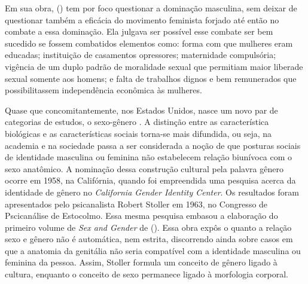 Em sua obra,  (\citeyear{BEAUVOIR1967}) tem por foco questionar a dominação masculina, sem deixar de questionar também a eficácia do movimento feminista forjado até então no combate a essa dominação. Ela julgava ser possível esse combate ser bem sucedido se fossem combatidos elementos como: forma com que mulheres eram educadas; instituição de casamentos opressores; maternidade compulsória; vigência de um duplo padrão de moralidade sexual que permitiam maior liberade sexual somente aos homens; e falta de trabalhos dignos e bem remunerados que possibilitassem independência econômica às mulheres. 

Quase que concomitantemente, nos Estados Unidos, nasce um novo par de categorias de estudos, o sexo-gênero \cite{FRAISSE2001,STOLKE2004,HARAWAY2004}. A distinção entre as característica biológicas e as características sociais torna-se mais difundida, ou seja, na academia e na sociedade passa a ser considerada a noção de que posturas sociais de identidade masculina ou feminina não estabelecem relação biunívoca com o sexo anatômico.
A nominação dessa construção cultural pela palavra gênero ocorre em 1958, na Califórnia, quando foi empreendida uma pesquisa acerca da identidade de gênero no \emph{California Gender Identity Center}. Os resultados foram apresentados pelo psicanalista Robert Stoller em 1963, no Congresso de Pscicanálise de Estocolmo. Essa mesma pesquisa embasou a elaboração do primeiro volume de \emph{Sex and Gender} de  (\citeyear{STOLLER1968}). Essa obra expôs o quanto a relação sexo e gênero não é automática, nem estrita, discorrendo ainda sobre casos em que a anatomia da genitália não seria compatível com a identidade masculina ou feminina da pessoa. Assim, Stoller formula um conceito de gênero ligado à cultura, enquanto o conceito de sexo permanece ligado à morfologia corporal.

